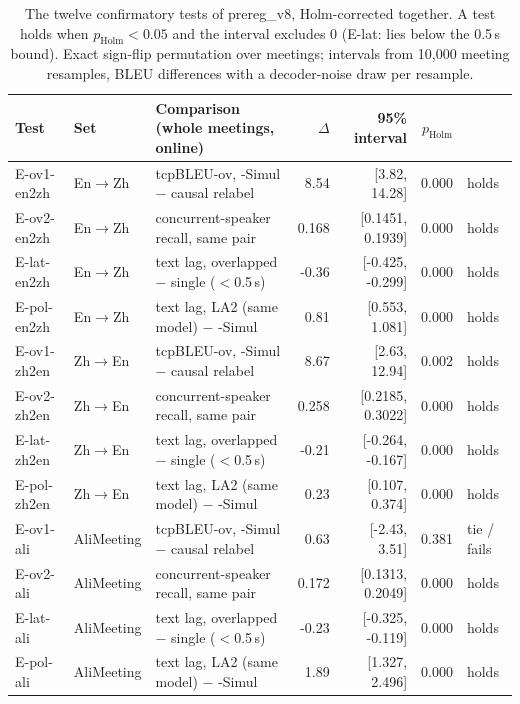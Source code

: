 \begin{table}[t]
\centering\small
\setlength{\tabcolsep}{4pt}
\begin{tabular}{lllrrrl}
\toprule
Test & Set & Comparison (whole meetings, online) & $\Delta$ & 95\% interval & $p_\text{Holm}$ & \\
\midrule
E-ov1-en2zh & En$\rightarrow$Zh & tcpBLEU-ov, \sys{}-Simul $-$ causal relabel & 8.54 & [3.82, 14.28] & 0.000 & holds \\
E-ov2-en2zh & En$\rightarrow$Zh & concurrent-speaker recall, same pair & 0.168 & [0.1451, 0.1939] & 0.000 & holds \\
E-lat-en2zh & En$\rightarrow$Zh & text lag, overlapped $-$ single ($<$0.5\,s) & -0.36 & [-0.425, -0.299] & 0.000 & holds \\
E-pol-en2zh & En$\rightarrow$Zh & text lag, LA2 (same model) $-$ \sys{}-Simul & 0.81 & [0.553, 1.081] & 0.000 & holds \\
E-ov1-zh2en & Zh$\rightarrow$En & tcpBLEU-ov, \sys{}-Simul $-$ causal relabel & 8.67 & [2.63, 12.94] & 0.002 & holds \\
E-ov2-zh2en & Zh$\rightarrow$En & concurrent-speaker recall, same pair & 0.258 & [0.2185, 0.3022] & 0.000 & holds \\
E-lat-zh2en & Zh$\rightarrow$En & text lag, overlapped $-$ single ($<$0.5\,s) & -0.21 & [-0.264, -0.167] & 0.000 & holds \\
E-pol-zh2en & Zh$\rightarrow$En & text lag, LA2 (same model) $-$ \sys{}-Simul & 0.23 & [0.107, 0.374] & 0.000 & holds \\
E-ov1-ali & AliMeeting & tcpBLEU-ov, \sys{}-Simul $-$ causal relabel & 0.63 & [-2.43, 3.51] & 0.381 & tie / fails \\
E-ov2-ali & AliMeeting & concurrent-speaker recall, same pair & 0.172 & [0.1313, 0.2049] & 0.000 & holds \\
E-lat-ali & AliMeeting & text lag, overlapped $-$ single ($<$0.5\,s) & -0.23 & [-0.325, -0.119] & 0.000 & holds \\
E-pol-ali & AliMeeting & text lag, LA2 (same model) $-$ \sys{}-Simul & 1.89 & [1.327, 2.496] & 0.000 & holds \\
\bottomrule
\end{tabular}
\caption{The twelve confirmatory tests of prereg\_v8, Holm-corrected together. A test holds when $p_\text{Holm}<0.05$ and
the interval excludes 0 (E-lat: lies below the 0.5\,s bound). Exact sign-flip permutation over meetings; intervals from
10,000 meeting resamples, BLEU differences with a decoder-noise draw per resample.}
\label{tab:reg8}
\end{table}
